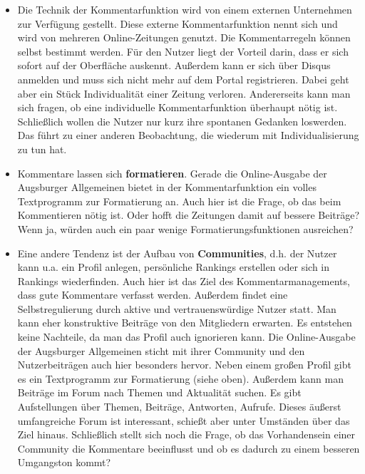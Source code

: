 \begin{itemize}
\item Die Technik der Kommentarfunktion wird von einem externen Unternehmen zur Verfügung gestellt. Diese externe 
Kommentarfunktion nennt sich \grqq\- und wird von mehreren Online-Zeitungen genutzt. Die Kommentarregeln können selbst bestimmt werden. Für den Nutzer liegt der Vorteil darin, dass er sich sofort auf der Oberfläche auskennt. Außerdem kann er sich über Disqus anmelden und muss sich nicht mehr auf dem Portal registrieren. Dabei geht aber ein Stück Individualität einer Zeitung verloren. Andererseits kann man sich fragen, ob eine individuelle Kommentarfunktion überhaupt nötig ist. Schließlich wollen die Nutzer nur kurz ihre spontanen Gedanken loswerden. Das führt zu einer anderen Beobachtung, die wiederum mit Individualisierung zu tun hat. 
\item Kommentare lassen sich {\bfseries formatieren}. Gerade die Online-Ausgabe der Augsburger Allgemeinen bietet in der Kommentarfunktion ein volles Textprogramm zur Formatierung an.  Auch hier ist die Frage, ob das beim Kommentieren nötig ist. Oder hofft die Zeitungen damit auf bessere Beiträge? Wenn ja, würden auch ein paar wenige Formatierungsfunktionen ausreichen? 

\item Eine andere Tendenz ist der Aufbau von {\bfseries Communities}, d.h. der Nutzer kann u.a. ein Profil anlegen, persönliche Rankings erstellen oder sich in Rankings wiederfinden. Auch hier ist das Ziel des Kommentarmanagements, dass gute Kommentare verfasst werden. Außerdem findet eine Selbstregulierung durch aktive und vertrauenswürdige Nutzer statt. Man kann eher konstruktive Beiträge von den Mitgliedern erwarten. Es entstehen keine Nachteile, da man das Profil auch ignorieren kann.
Die Online-Ausgabe der Augsburger Allgemeinen sticht mit ihrer Community und den Nutzerbeiträgen auch hier besonders hervor. Neben einem großen Profil gibt es ein Textprogramm zur Formatierung (siehe oben). Außerdem kann man Beiträge im Forum nach Themen und Aktualität suchen. Es gibt Aufstellungen über Themen, Beiträge, Antworten, Aufrufe. Dieses äußerst umfangreiche Forum ist interessant, schießt aber unter Umständen über das Ziel hinaus. 
Schließlich stellt sich noch die Frage, ob das Vorhandensein einer Community die Kommentare beeinflusst und ob es dadurch zu einem besseren Umgangston kommt?


\end{itemize}

